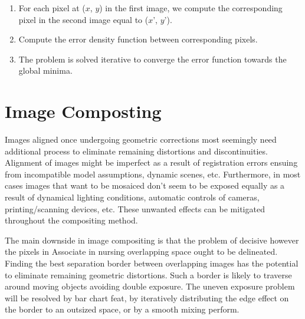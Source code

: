 \begin{enumerate}
	\item For each pixel at ($x$, $y$) in the first image, we compute the corresponding pixel in the second image equal to ($x$', $y$').
	\item Compute the error density function between corresponding pixels.
	\item The problem is solved iterative to converge the error function towards the global minima.
\end{enumerate}

\section{Image Composting}
Images aligned once undergoing geometric corrections most seemingly need additional process to eliminate remaining distortions and discontinuities. Alignment of images might be imperfect as a result of registration errors ensuing from incompatible model assumptions, dynamic scenes, etc. Furthermore, in most cases images that want to be mosaiced don't seem to be exposed equally as a result of dynamical lighting conditions, automatic controls of cameras, printing/scanning devices, etc. These unwanted effects can be mitigated throughout the compositing method. 


The main downside in image compositing is that the problem of decisive however the pixels in Associate in nursing overlapping space ought to be delineated. Finding the best separation border between overlapping images has the potential to eliminate remaining geometric distortions. Such a border is likely to traverse around moving objects avoiding double exposure. The uneven exposure problem will be resolved by bar chart feat, by iteratively distributing the edge effect on the border to an outsized space, or by a smooth mixing perform.


